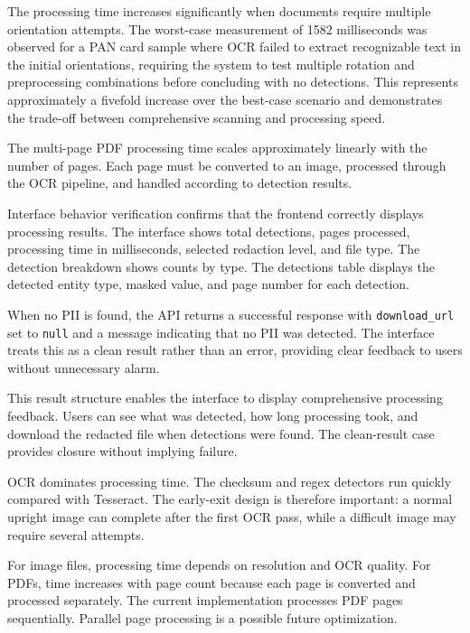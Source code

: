 The processing time increases significantly when documents require multiple orientation attempts. The worst-case measurement of 1582 milliseconds was observed for a PAN card sample where OCR failed to extract recognizable text in the initial orientations, requiring the system to test multiple rotation and preprocessing combinations before concluding with no detections. This represents approximately a fivefold increase over the best-case scenario and demonstrates the trade-off between comprehensive scanning and processing speed.

The multi-page PDF processing time scales approximately linearly with the number of pages. Each page must be converted to an image, processed through the OCR pipeline, and handled according to detection results.

Interface behavior verification confirms that the frontend correctly displays processing results. The interface shows total detections, pages processed, processing time in milliseconds, selected redaction level, and file type. The detection breakdown shows counts by type. The detections table displays the detected entity type, masked value, and page number for each detection.

When no PII is found, the API returns a successful response with \texttt{download\_url} set to \texttt{null} and a message indicating that no PII was detected. The interface treats this as a clean result rather than an error, providing clear feedback to users without unnecessary alarm.

\bigskip

This result structure enables the interface to display comprehensive processing feedback. Users can see what was detected, how long processing took, and download the redacted file when detections were found. The clean-result case provides closure without implying failure.

\bigskip

OCR dominates processing time. The checksum and regex detectors run quickly compared with Tesseract. The early-exit design is therefore important: a normal upright image can complete after the first OCR pass, while a difficult image may require several attempts.

For image files, processing time depends on resolution and OCR quality. For PDFs, time increases with page count because each page is converted and processed separately. The current implementation processes PDF pages sequentially. Parallel page processing is a possible future optimization.

